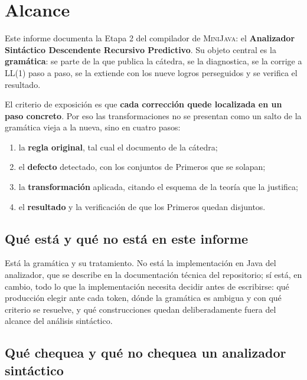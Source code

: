 \section{Alcance}

Este informe documenta la Etapa 2 del compilador de \textsc{MiniJava}: el \textbf{Analizador
Sintáctico Descendente Recursivo Predictivo}. Su objeto central es la \textbf{gramática}: se
parte de la que publica la cátedra, se la diagnostica, se la corrige a LL(1) paso a
paso, se la extiende con los nueve logros perseguidos y se verifica el resultado.

El criterio de exposición es que \textbf{cada corrección quede localizada en un paso concreto}.
Por eso las transformaciones no se presentan como un salto de la gramática vieja a la nueva, sino
en cuatro pasos:

\begin{enumerate}
  \item la \textbf{regla original}, tal cual el documento de la cátedra;
  \item el \textbf{defecto} detectado, con los conjuntos de Primeros que se solapan;
  \item la \textbf{transformación} aplicada, citando el esquema de la teoría que la justifica;
  \item el \textbf{resultado} y la verificación de que los Primeros quedan disjuntos.
\end{enumerate}

\subsection{Qué está y qué no está en este informe}

Está la gramática y su tratamiento. No está la implementación en Java del analizador, que se
describe en la documentación técnica del repositorio; sí está, en cambio, todo lo que la
implementación necesita decidir antes de escribirse: qué producción elegir ante cada token, dónde
la gramática es ambigua y con qué criterio se resuelve, y qué construcciones quedan deliberadamente
fuera del alcance del análisis sintáctico.

\subsection{Qué chequea y qué no chequea un analizador sintáctico}
\label{sec:alcance-chequeos}

